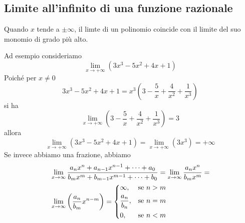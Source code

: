 \subsection{Limite all'infinito di una funzione razionale}
\hypertarget{teor:limiteInfinitoFunzRaz}{}
\begin{limiteInfinitoFunzRaz}
	Quando $x$ tende a $\pm\infty$, il limte di un polinomio coincide con il limite del suo monomio di
	grado più alto.
\end{limiteInfinitoFunzRaz}
Ad esempio consideriamo
\begin{equation*}
\lim\limits_{x\to+\infty}(3x^3-5x^2+4x+1)
\end{equation*}
Poiché per $x\neq0$
\begin{equation*}
3x^3-5x^2+4x+1=x^3\left(3-\frac{5}{x}+\frac{4}{x^2}+\frac{1}{x^3}\right)
\end{equation*}
si ha
\begin{equation*}
\lim\limits_{x\to+\infty}\left(3-\frac{5}{x}+\frac{4}{x^2}+\frac{1}{x^3}\right) = 3
\end{equation*}
allora
\begin{equation*}
\lim\limits_{x\to+\infty}(3x^3-5x^2+4x+1)=\lim\limits_{x\to+\infty}(3x^3) = +\infty
\end{equation*}
Se invece abbiamo una frazione, abbiamo
\begin{align*}
&\lim\limits_{x\to\infty}\frac{a_nx^n+a_{n-1}x^{n-1}+\dotsb+a_0}{b_mx^m+b_{m-1}x^{m-1}+\dotsb+b_0}=
\lim\limits_{x\to\infty}\frac{a_nx^n}{b_mx^m} = \\
&\lim\limits_{x\to\infty}\left(\frac{a_n}{b_m}x^{n-m}\right) =
\begin{dcases}
\infty, &\text{se } n > m\\
\frac{a_n}{b_n}, &\text{se } n = m\\
0, &\text{se } n < m
\end{dcases}
\end{align*}

